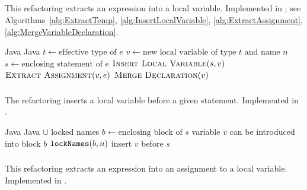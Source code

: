 \subsection{}
This refactoring extracts an expression into a local variable. Implemented in ; see Algorithms~\ref{alg:ExtractTemp}, \ref{alg:InsertLocalVariable}, \ref{alg:ExtractAssignment}, \ref{alg:MergeVariableDeclaration}.

\begin{algorithm}
\caption{$\refactoring{Extract Temp}(e : \type{Expr}, n : \type{Name})$}
\label{alg:ExtractTemp}
\begin{algorithmic}[1]
\REQUIRE Java
\ENSURE Java
\medskip
\STATE $t \leftarrow \text{effective type of $e$}$
\STATE $v \leftarrow \text{new local variable of type $t$ and name $n$}$
\STATE $s \leftarrow \text{enclosing statement of $e$}$
\STATE $\textsc{Insert Local Variable}(s, v)$
\STATE $\textsc{Extract Assignment}(v, e)$
\STATE $\textsc{Merge Declaration}(v)$
\end{algorithmic}
\end{algorithm}

\subsubsection{}
The refactoring inserts a local variable before a given statement. Implemented in .

\begin{algorithm}
\caption{$\refactoring{Insert Local Variable}(s : \type{Stmt}, v : \type{LocalVar}$}
\label{alg:InsertLocalVariable}
\begin{algorithmic}[1]
\REQUIRE Java
\ENSURE Java $\cup$ locked names
\medskip
\STATE $b \leftarrow \text{enclosing block of $s$}$
\STATE \assert variable $v$ can be introduced into block $b$
\STATE $\text{\texttt{lockNames}}(b, n)$
\STATE insert $v$ before $s$
\end{algorithmic}
\end{algorithm}

\subsubsection{}
This refactoring extracts an expression into an assignment to a local variable. Implemented in .

